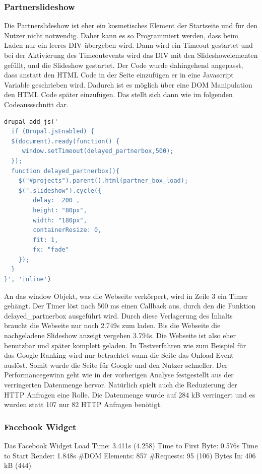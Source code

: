 \subsubsection{Partnerslideshow} Die Partnerslideshow ist eher ein kosmetisches Element der Startseite und für den Nutzer nicht notwendig. Daher kann es so Programmiert werden, dass beim Laden nur ein leeres DIV übergeben wird. Dann wird ein Timeout gestartet und bei der Aktivierung des Timeoutevents wird das DIV mit den Slideshowelementen gefüllt, und die Slideshow gestartet. Der Code wurde dahingehend angepasst, dass anstatt den HTML Code in der Seite einzufügen er in eine Javascript Variable geschrieben wird. Dadurch ist es möglich über eine DOM Manipulation den HTML Code später einzufügen. Das stellt sich dann wie im folgenden Codeaussschnitt dar.
\begin{lstlisting}[language=php,label=Javascript wird eingefügt für die Slideshow,caption=Javascript wird eingefügt für die Slideshow]
drupal_add_js('
  if (Drupal.jsEnabled) {
  $(document).ready(function() {
     window.setTimeout(delayed_partnerbox,500);
  });
  function delayed_partnerbox(){
	$("#projects").parent().html(partner_box_load);
	$(".slideshow").cycle({
	    delay:  200 ,
	    height: "80px",
	    width: "180px",
	    containerResize: 0,
	    fit: 1,
	    fx: "fade"
	});
  }
}', 'inline')
\end{lstlisting}
An das window Objekt, was die Webseite verkörpert, wird in Zeile 3 ein Timer gehängt. Der Timer löst nach 500 ms einen Callback aus, durch den die Funktion delayed_partnerbox ausgeführt wird. Durch diese Verlagerung des Inhalts braucht die Webseite nur noch 2.749s zum laden. Bis die Webseite die nachgeladene Slideshow anzeigt vergehen 3.794s. Die Webseite ist also eher benutzbar und später komplett geladen. In Testverfahren wie zum Beispiel für das Google Ranking wird nur betrachtet wann die Seite das Onload Event auslöst. Somit wurde die Seite für Google und den Nutzer schneller. Der Performancegewinn geht wie in der vorherigen Analyse festgestellt aus der verringerten Datenmenge hervor. Natürlich spielt auch die Reduzierung der HTTP Anfragen eine Rolle. Die Datenmenge wurde auf 284 kB verringert und es wurden statt 107 nur 82 HTTP Anfragen benötigt.

\subsubsection{Facebook Widget} Das Facebook Widget 
Load Time: 3.411s (4.258)
Time to First Byte: 0.576s %
Time to Start Render: 1.848s
\#DOM Elements: 857
\#Requests: 95 (106)
Bytes In: 406 kB (444)

